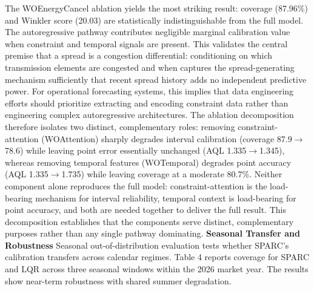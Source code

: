 \documentclass[twoside]{article}
\begin{document}
The WOEnergyCancel ablation yields the most striking result: coverage (87.96\%) and Winkler score (20.03) are statistically indistinguishable from the full model. The autoregressive pathway contributes negligible marginal calibration value when constraint and temporal signals are present. This validates the central premise that a spread is a congestion differential: conditioning on which transmission elements are congested and when captures the spread-generating mechanism sufficiently that recent spread history adds no independent predictive power. For operational forecasting systems, this implies that data engineering efforts should prioritize extracting and encoding constraint data rather than engineering complex autoregressive architectures. The ablation decomposition therefore isolates two distinct, complementary roles: removing constraint-attention (WOAttention) sharply degrades interval calibration (coverage 87.9$\rightarrow$78.6) while leaving point error essentially unchanged (AQL 1.335$\rightarrow$1.345), whereas removing temporal features (WOTemporal) degrades point accuracy (AQL 1.335$\rightarrow$1.735) while leaving coverage at a moderate 80.7\%. Neither component alone reproduces the full model: constraint-attention is the load-bearing mechanism for interval reliability, temporal context is load-bearing for point accuracy, and both are needed together to deliver the full result. This decomposition establishes that the components serve distinct, complementary purposes rather than any single pathway dominating.
\textbf{Seasonal Transfer and Robustness}
Seasonal out-of-distribution evaluation tests whether SPARC's calibration transfers across calendar regimes. Table 4 reports coverage for SPARC and LQR across three seasonal windows within the 2026 market year. The results show near-term robustness with shared summer degradation.
\begin{table}[t]
\caption{Seasonal transfer coverage.}
\label{tab:4}
\centering
{}
\end{table}
\end{document}
